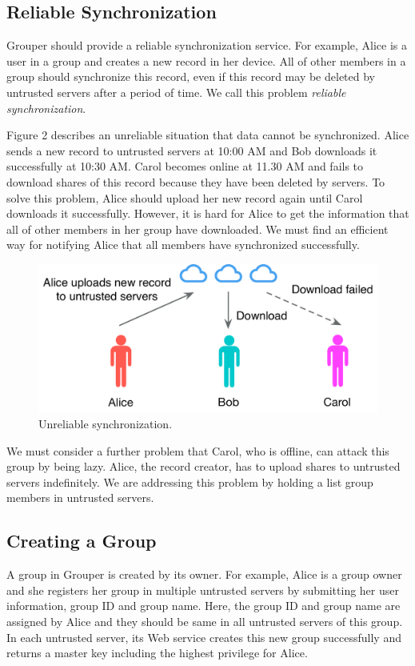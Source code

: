\documentclass[twocolumn,10pt]{article}
\begin{document}
\subsection{Reliable Synchronization}
Grouper should provide a reliable synchronization service. For example, Alice is a user in a group and creates a new record in her device. All of other members in a group should synchronize this record, even if this record may be deleted by untrusted servers after a period of time. We call this problem \emph{reliable synchronization}.

Figure 2 describes an unreliable situation that data cannot be synchronized. Alice sends a new record to untrusted servers at 10:00 AM and Bob downloads it successfully at 10:30 AM. Carol becomes online at 11.30 AM and fails to download shares of this record because they have been deleted by servers. To solve this problem, Alice should upload her new record again until Carol downloads it successfully. However, it is hard for Alice to get the information that all of other members in her group have downloaded. We must find an efficient way for notifying Alice that all members have synchronized successfully.

\begin{figure}[t]
	\centering
	\includegraphics[scale=0.38]{unreliabe_sync}
	\caption{Unreliable synchronization.}
\end{figure}

We must consider a further problem that Carol, who is offline, can attack this group by being lazy. Alice, the record creator, has to upload shares to untrusted servers indefinitely. We are addressing this problem by holding a list group members in untrusted servers.

\subsection{Creating a Group}

A group in Grouper is created by its owner. For example, Alice is a group owner and she registers her group in multiple untrusted servers by submitting her user information, group ID and group name. Here, the group ID and group name are assigned by Alice and they should be same in all untrusted servers of this group. In each untrusted server, its Web service creates this new group successfully and returns a master key including the highest privilege for Alice.
\end{document}
